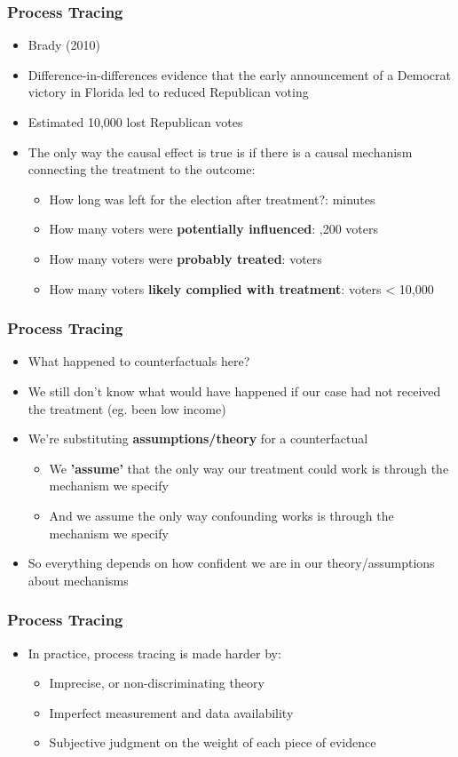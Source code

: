 \documentclass[xcolor=x11names,compress]{beamer}\usepackage[]{graphicx}\usepackage[]{color}
\renewcommand{\(}{\begin{columns}}
\renewcommand{\)}{\end{columns}}
\newcommand{\<}[1]{\begin{column}{#1}}
\renewcommand{\>}{\end{column}}
\begin{document}
\begin{frame}
\frametitle{Process Tracing}
\begin{itemize}
\item Brady (2010)
\pause
\item Difference-in-differences evidence that the early announcement of a Democrat victory in Florida led to reduced Republican voting
\pause
\item Estimated 10,000 lost Republican votes
\pause
\item The only way the causal effect is true is if there is a causal mechanism connecting the treatment to the outcome:
\pause
\begin{itemize}
\item How long was left for the election after treatment?:  minutes
\pause
\item How many voters were \textbf{potentially influenced}: ,200 voters
\pause
\item How many voters were \textbf{probably treated}:  voters
\pause
\item How many voters \textbf{likely complied with treatment}:  voters \pause < 10,000
\end{itemize}
\end{itemize}
\end{frame}

\begin{frame}
\frametitle{Process Tracing}
\begin{itemize}
\item What happened to counterfactuals here?
\pause
\item We still don't know what would have happened if our case had not received the treatment (eg. been low income)
\pause
\item We're substituting \textbf{assumptions/theory} for a counterfactual
\pause
\begin{itemize}
\item We \textbf{'assume'} that the only way our treatment could work is through the mechanism we specify
\pause
\item And we assume the only way confounding works is through the mechanism we specify
\end{itemize}
\item So everything depends on how confident we are in our theory/assumptions about mechanisms
\end{itemize}
\end{frame}

\begin{frame}
\frametitle{Process Tracing}
\begin{itemize}
\item In practice, process tracing is made harder by:
\pause
\begin{itemize}
\item Imprecise, or non-discriminating theory
\pause
\item Imperfect measurement and data availability
\pause
\item Subjective judgment on the weight of each piece of evidence
\end{itemize}
\end{itemize}
\end{frame}
\end{document}
